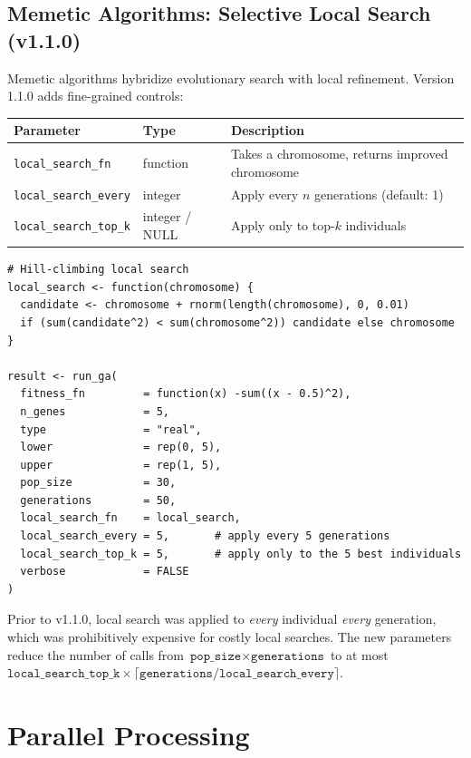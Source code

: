 \documentclass[11pt,a4paper]{article}
\begin{document}
\subsection{Memetic Algorithms: Selective Local Search (v1.1.0)}

Memetic algorithms \citep{Moscato1989} hybridize evolutionary search with
local refinement. Version 1.1.0 adds fine-grained controls:

\begin{center}
\begin{tabular}{lll}
  \toprule
  \textbf{Parameter} & \textbf{Type} & \textbf{Description} \\
  \midrule
  \texttt{local\_search\_fn}    & function       & Takes a chromosome, returns improved chromosome \\
  \texttt{local\_search\_every} & integer        & Apply every $n$ generations (default: 1) \\
  \texttt{local\_search\_top\_k}& integer / NULL & Apply only to top-$k$ individuals \\
  \bottomrule
\end{tabular}
\end{center}

\begin{lstlisting}
# Hill-climbing local search
local_search <- function(chromosome) {
  candidate <- chromosome + rnorm(length(chromosome), 0, 0.01)
  if (sum(candidate^2) < sum(chromosome^2)) candidate else chromosome
}

result <- run_ga(
  fitness_fn         = function(x) -sum((x - 0.5)^2),
  n_genes            = 5,
  type               = "real",
  lower              = rep(0, 5),
  upper              = rep(1, 5),
  pop_size           = 30,
  generations        = 50,
  local_search_fn    = local_search,
  local_search_every = 5,       # apply every 5 generations
  local_search_top_k = 5,       # apply only to the 5 best individuals
  verbose            = FALSE
)
\end{lstlisting}

Prior to v1.1.0, local search was applied to \emph{every} individual
\emph{every} generation, which was prohibitively expensive for costly local
searches. The new parameters reduce the number of calls from
$\texttt{pop\_size} \times \texttt{generations}$ to at most
$\texttt{local\_search\_top\_k} \times
\lceil\texttt{generations}/\texttt{local\_search\_every}\rceil$.

\section{Parallel Processing}
\end{document}
